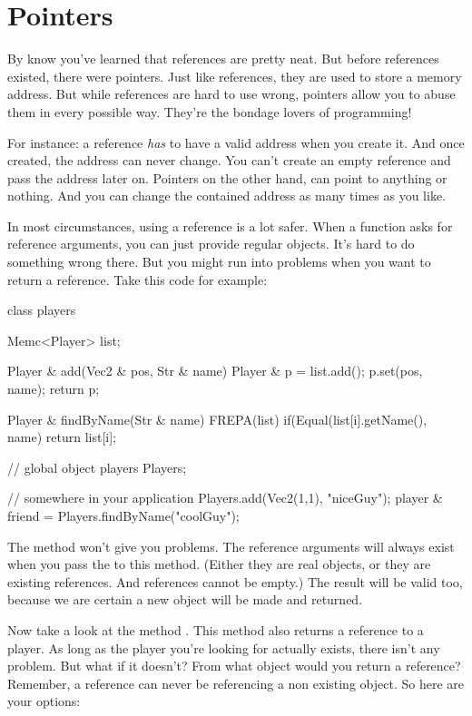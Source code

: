 \chapter{Pointers}

By know you've learned that references are pretty neat. But before references existed, there were pointers. Just like references, they are used to store a memory address. But while references are hard to use wrong, pointers allow you to abuse them in every possible way. They're the bondage lovers of programming!

For instance: a reference \textsl{has} to have a valid address when you create it. And once created, the address can never change. You can't create an empty reference and pass the address later on. Pointers on the other hand, can point to anything or nothing. And you can change the contained address as many times as you like.

In most circumstances, using a reference is a lot safer. When a function asks for reference arguments, you can just provide regular objects. It's hard to do something wrong there. But you might run into problems when you want to return a reference. Take this code for example:

\begin{code}
class players {
  Memc<Player> list;
	
  Player &  add(Vec2 & pos, Str & name) {
    Player & p = list.add();
    p.set(pos, name);
    return p;
  }	  

  Player & findByName(Str & name) {
    FREPA(list) {
      if(Equal(list[i].getName(), name) {
        return list[i];
      }
    }
  }	
}
// global object
players Players;

// somewhere in your application
Players.add(Vec2(1,1), "niceGuy");
player & friend = Players.findByName("coolGuy");
\end{code}

The  method won't give you problems. The reference arguments will always exist when you pass the to this method. (Either they are real objects, or they are existing references. And references cannot be empty.) The result will be valid too, because we are certain a new object will be made and returned.

Now take a look at the method . This method also returns a reference to a player. As long as the player you're looking for actually exists, there isn't any problem. But what if it doesn't? From what object would you return a reference? Remember, a reference can never be referencing a non existing object. So here are your options:


